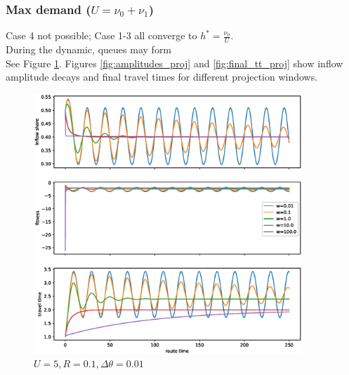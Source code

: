 \documentclass[12pt]{article}
\begin{document}



\newpage

\subsubsection*{Max demand ($U = \nu_0 + \nu_1$)}


Case 4 not possible; Case 1-3 all converge to $h^* = \frac{\nu_0}{U}$.
\\
During the dynamic, queues may form
\\
See Figure \ref{fig:fluctuations_proj}. Figures \ref{fig:amplitudes_proj} and \ref{fig:final_tt_proj} show inflow amplitude decays and final travel times for different projection windows.

\begin{figure}
	\includegraphics[width=0.9\textwidth]{img/replicator_proj_tt.eps}
	\caption{ $ U = 5, R=0.1, \Delta \theta = 0.01$}
	\label{fig:fluctuations_proj}

\end{figure}
	
\end{document}
